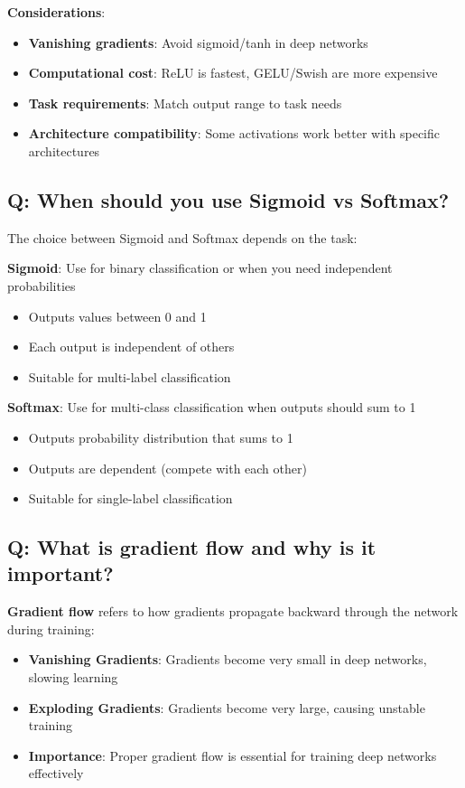 \textbf{Considerations}:
\begin{itemize}
	\item \textbf{Vanishing gradients}: Avoid sigmoid/tanh in deep networks
	\item \textbf{Computational cost}: ReLU is fastest, GELU/Swish are more expensive
	\item \textbf{Task requirements}: Match output range to task needs
	\item \textbf{Architecture compatibility}: Some activations work better with specific architectures
\end{itemize}

\subsection*{\textcolor{primaryteal}{Q: When should you use Sigmoid vs Softmax?}}
The choice between Sigmoid and Softmax depends on the task:

\textbf{Sigmoid}: Use for binary classification or when you need independent probabilities
\begin{itemize}
	\item Outputs values between 0 and 1
	\item Each output is independent of others
	\item Suitable for multi-label classification
\end{itemize}

\textbf{Softmax}: Use for multi-class classification when outputs should sum to 1
\begin{itemize}
	\item Outputs probability distribution that sums to 1
	\item Outputs are dependent (compete with each other)
	\item Suitable for single-label classification
\end{itemize}

\subsection*{\textcolor{primaryteal}{Q: What is gradient flow and why is it important?}}
\textbf{Gradient flow} refers to how gradients propagate backward through the network during training:

\begin{itemize}
	\item \textbf{Vanishing Gradients}: Gradients become very small in deep networks, slowing learning
	\item \textbf{Exploding Gradients}: Gradients become very large, causing unstable training
	\item \textbf{Importance}: Proper gradient flow is essential for training deep networks effectively
\end{itemize}

